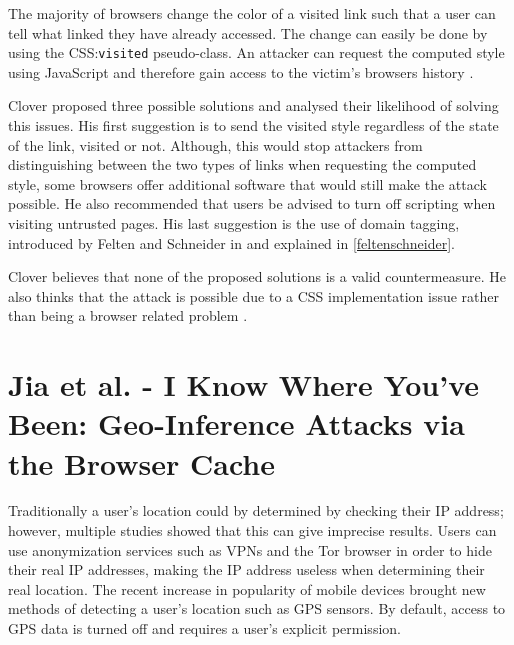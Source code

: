 \documentclass[10pt,a4paper,twoside]{book}
\begin{document}
The majority of browsers change the color of a visited link such that a user can tell what linked they have already accessed. The change can easily be done by using the CSS:\texttt{visited} pseudo-class. An attacker can request the computed style using JavaScript and therefore gain access to the victim's browsers history \cite{cssvisited}.

Clover proposed three possible solutions and analysed their likelihood of solving this issues. His first suggestion is to send the visited style regardless of the state of the link, visited or not. Although, this would stop attackers from distinguishing between the two types of links when requesting the computed style, some browsers offer additional software that would still make the attack possible. He also recommended that users be advised to turn off scripting when visiting untrusted pages. His last suggestion is the use of domain tagging, introduced by Felten and Schneider in \cite{felten2000timing} and explained in \ref{feltenschneider}.

Clover believes that none of the proposed solutions is a valid countermeasure. He also thinks that the attack is possible due to a CSS implementation issue rather than being a browser related problem \cite{cssvisited}.


\section{Jia et al. - I Know Where You've Been: Geo-Inference Attacks via the Browser Cache}

Traditionally a user's location could by determined by checking their IP address; however, multiple studies showed that this can give imprecise results. Users can use anonymization services such as VPNs and the Tor browser in order to hide their real IP addresses, making the IP address useless when determining their real location. The recent increase in popularity of mobile devices brought new methods of detecting a user's location such as GPS sensors. By default, access to GPS data is turned off and requires a user's explicit permission. 
\end{document}
